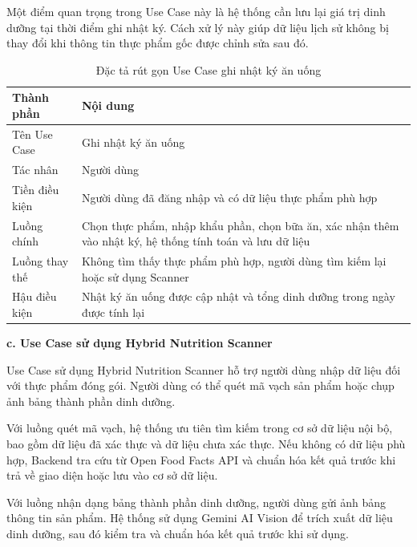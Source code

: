 \documentclass[12pt, a4paper]{report}
\begin{document}
Một điểm quan trọng trong Use Case này là hệ thống cần lưu lại giá trị dinh dưỡng tại thời điểm ghi nhật ký. Cách xử lý này giúp dữ liệu lịch sử không bị thay đổi khi thông tin thực phẩm gốc được chỉnh sửa sau đó.
\begin{table}[htbp]
\centering
\caption{Đặc tả rút gọn Use Case ghi nhật ký ăn uống}
\begin{tabular}{|p{5cm}|p{10cm}|}
\hline
\textbf{Thành phần} & \textbf{Nội dung} \\
\hline
Tên Use Case & Ghi nhật ký ăn uống \\
\hline
Tác nhân & Người dùng \\
\hline
Tiền điều kiện & Người dùng đã đăng nhập và có dữ liệu thực phẩm phù hợp \\
\hline
Luồng chính & Chọn thực phẩm, nhập khẩu phần, chọn bữa ăn, xác nhận thêm vào nhật ký, hệ thống tính toán và lưu dữ liệu \\
\hline
Luồng thay thế & Không tìm thấy thực phẩm phù hợp, người dùng tìm kiếm lại hoặc sử dụng Scanner \\
\hline
Hậu điều kiện & Nhật ký ăn uống được cập nhật và tổng dinh dưỡng trong ngày được tính lại \\
\hline
\hline
\hline
\end{tabular}
\end{table}

\textbf{c. Use Case sử dụng Hybrid Nutrition Scanner}

Use Case sử dụng Hybrid Nutrition Scanner hỗ trợ người dùng nhập dữ liệu đối với thực phẩm đóng gói. Người dùng có thể quét mã vạch sản phẩm hoặc chụp ảnh bảng thành phần dinh dưỡng.

Với luồng quét mã vạch, hệ thống ưu tiên tìm kiếm trong cơ sở dữ liệu nội bộ, bao gồm dữ liệu đã xác thực và dữ liệu chưa xác thực. Nếu không có dữ liệu phù hợp, Backend tra cứu từ Open Food Facts API và chuẩn hóa kết quả trước khi trả về giao diện hoặc lưu vào cơ sở dữ liệu.

Với luồng nhận dạng bảng thành phần dinh dưỡng, người dùng gửi ảnh bảng thông tin sản phẩm. Hệ thống sử dụng Gemini AI Vision để trích xuất dữ liệu dinh dưỡng, sau đó kiểm tra và chuẩn hóa kết quả trước khi sử dụng.
\end{document}
